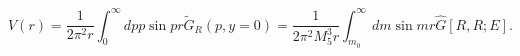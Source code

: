 \begin{equation}
\label{rev3}
V(r) = \frac{1}{2 \pi^2 r} \int_0^{\infty} dp p \sin pr
\tilde{G}_R(p, y=0)
= \frac{1}{2\pi^2 M_5^3 r} \int_{m_0}^{\infty} dm \sin mr
\hat{G}[R, R; E].
\end{equation} 
